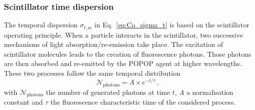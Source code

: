 \subsubsection*{Scintillator time dispersion}
The temporal dispersion $\sigma_{t,\text{sc}}$ in Eq.~\eqref{eq:Co_sigma_t} is based on the  scintillator operating principle.
When a particle interacts in the scintillator, two successive mechanisms of light absorption/re-emission take place.
The excitation of scintillator molecules leads to the creation of fluorescence photons.
Those photons are then absorbed and re-emitted by the POPOP agent at higher wavelengths.
These two processes follow the same temporal distribution
\begin{equation}
  \mathcal{N}_{\text{photons}} = A\times e^{-t/\tau}\,,
  \label{eq:fluorescence_photons_time}
\end{equation}
with $\mathcal{N}_{\text{photons}}$ the number of generated photons at time $t$, $A$ a normalisation constant and $\tau$ the fluorescence characteristic time of the considered process.

